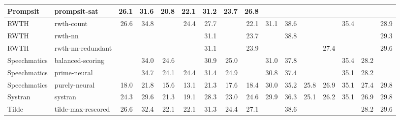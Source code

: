 \begin{table*}
\begin{center}
\begin{tabular}{|l|l|rrrrrrr|rrrrrrr|}
Prompsit & prompsit-sat & 26.1 & 31.6 & 20.8 & 22.1 & 31.2 & 23.7 & 26.8 & \cellcolor{lightgreen}{31.7} & \cellcolor{lightyellow}{39.2} & \cellcolor{lightyellow}{26.7} & \cellcolor{lightgreen}{28.2} & \cellcolor{lightgreen}{36.4} & \cellcolor{lightyellow}{28.7} & \cellcolor{lightgreen}{30.8} \\ \hline
RWTH & rwth-count & 26.6 & 34.8 & \cellcolor{lightyellow}{25.0} & 24.4 & 27.7 & \cellcolor{lightyellow}{25.9} & 22.1 & 31.1 & 38.6 & \cellcolor{lightyellow}{26.9} & \cellcolor{lightyellow}{27.5} & 35.4 & \cellcolor{lightgreen}{29.0} & 28.9 \\ \hline
RWTH & rwth-nn & \cellcolor{lightyellow}{28.0} & \cellcolor{green}{36.0} & \cellcolor{lightgreen}{25.2} & \cellcolor{lightgreen}{25.2} & 31.1 & \cellcolor{green}{26.7} & 23.7 & \cellcolor{lightyellow}{31.2} & 38.8 & \cellcolor{lightyellow}{26.7} & \cellcolor{lightyellow}{27.7} & \cellcolor{lightyellow}{36.1} & \cellcolor{lightyellow}{28.7} & 29.3 \\ \hline
RWTH & rwth-nn-redundant & \cellcolor{lightyellow}{28.0} & \cellcolor{green}{36.0} & \cellcolor{lightgreen}{25.2} & \cellcolor{lightgreen}{25.3} & 31.1 & \cellcolor{lightgreen}{26.6} & 23.9 & \cellcolor{lightyellow}{31.3} & \cellcolor{lightyellow}{39.2} & \cellcolor{lightyellow}{26.5} & 27.4 & \cellcolor{lightgreen}{36.3} & \cellcolor{lightyellow}{28.7} & 29.6 \\ \hline
Speechmatics & balanced-scoring & \cellcolor{lightyellow}{27.9} & 34.0 & 24.6 & \cellcolor{lightyellow}{24.7} & 30.9 & 25.0 & \cellcolor{lightgreen}{28.0} & 31.0 & 37.8 & \cellcolor{lightyellow}{26.5} & \cellcolor{lightyellow}{27.9} & 35.4 & 28.2 & \cellcolor{lightyellow}{30.1} \\ \hline
Speechmatics & prime-neural & \cellcolor{lightyellow}{28.0} & 34.7 & 24.1 & 24.4 & 31.4 & 24.9 & \cellcolor{green}{28.2} & 30.8 & 37.4 & \cellcolor{lightyellow}{26.5} & \cellcolor{lightyellow}{27.8} & 35.1 & 28.2 & \cellcolor{lightyellow}{30.1} \\ \hline
Speechmatics & purely-neural & 18.0 & 21.8 & 15.6 & 13.1 & 21.3 & 17.6 & 18.4 & 30.0 & 35.2 & 25.8 & 26.9 & 35.1 & 27.4 & 29.8 \\ \hline
Systran & systran & 24.3 & 29.6 & 21.3 & 19.1 & 28.3 & 23.0 & 24.6 & 29.9 & 36.3 & 25.1 & 26.2 & 35.1 & 26.9 & 29.8 \\ \hline
Tilde & tilde-max-rescored & 26.6 & 32.4 & 22.1 & 22.1 & 31.3 & 24.4 & 27.1 & \cellcolor{lightyellow}{31.2} & 38.6 & \cellcolor{lightyellow}{26.8} & \cellcolor{lightyellow}{27.5} & \cellcolor{lightgreen}{36.6} & 28.2 & 29.6 \\ \hline

\end{tabular}
\end{center}
\end{table*}
